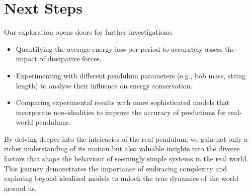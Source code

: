 \newpage
\thispagestyle{plain}
\section{Next Steps}

Our exploration opens doors for further investigations:

\begin{itemize}
	\item Quantifying the average energy loss per period to accurately assess the impact of dissipative forces.
	\item Experimenting with different pendulum parameters (e.g., bob mass, string length) to analyse their influence on energy conservation.
	\item Comparing experimental results with more sophisticated models that incorporate non-idealities to improve the accuracy of predictions for real-world pendulums.
\end{itemize}

By delving deeper into the intricacies of the real pendulum, we gain not only a richer understanding of its motion but also valuable insights into the diverse factors that shape the behaviour of seemingly simple systems in the real world. This journey demonstrates the importance of embracing complexity and exploring beyond idealized models to unlock the true dynamics of the world around us.
